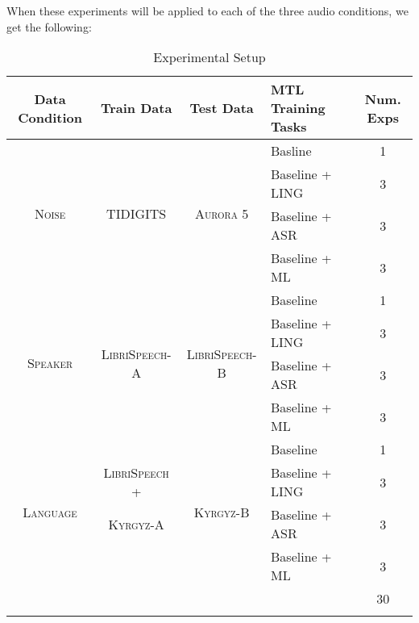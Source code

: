 \documentclass[10pt,a4paper]{article}
\begin{document}
When these experiments will be applied to each of the three audio conditions, we get the following:

  


\begin{table}[htbp]
  \centering
  \begin{adjustbox}{width=.95\textwidth}
    \begin{tabular}{ccclc}
      \toprule
      \textbf{Data Condition} & \textbf{Train Data} & \textbf{Test Data} & \textbf{MTL Training Tasks} & \textbf{Num. Exps} \\
      \midrule
      \multirow{4}{*}{\textsc{Noise}} & \multirow{4}{*}{\textsc{TIDIGITS}} & \multirow{4}{*}{\textsc{Aurora 5}} & Basline & 1\\
      & & & Baseline + LING & 3   \\
      & & & Baseline + ASR  & 3  \\
      & & & Baseline + ML   & 3  \\
      \midrule
      \multirow{4}{*}{\textsc{Speaker}} & \multirow{4}{*}{\textsc{LibriSpeech-A}} & \multirow{4}{*}{\textsc{LibriSpeech-B}} & Baseline & 1 \\
      & & & Baseline + LING & 3  \\
      & & & Baseline + ASR  & 3  \\
      & & & Baseline + ML   & 3  \\     \midrule
      \multirow{4}{*}{\textsc{Language}} & & \multirow{4}{*}{\textsc{Kyrgyz-B}} & Baseline & 1\\
      & \textsc{LibriSpeech +} & & Baseline + LING  & 3 \\
      &  \textsc{Kyrgyz-A} & & Baseline + ASR   & 3 \\
      & & & Baseline + ML & 3 \\
      \midrule
      &&&& 30\\
      \bottomrule\\
    \end{tabular}
    \label{table:data}
  \end{adjustbox}
  
  \caption{Experimental Setup}
  
\end{table}
\end{document}
